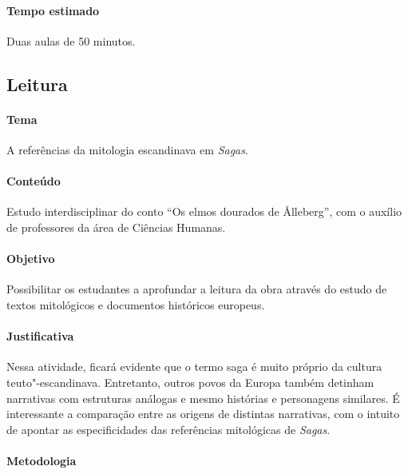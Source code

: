 \documentclass[12pt]{extarticle}
\begin{document}
\paragraph{Tempo estimado} Duas aulas de 50 minutos.


\subsection{Leitura}

\paragraph{Tema} A referências da mitologia escandinava em \emph{Sagas}.

 \paragraph{Conteúdo} Estudo interdisciplinar do conto ``Os elmos dourados de Ålleberg'',
 com o auxílio de professores da área de Ciências Humanas.

\paragraph{Objetivo} Possibilitar os estudantes a aprofundar a leitura da obra através do
estudo de textos mitológicos e documentos históricos europeus.

\paragraph{Justificativa} Nessa atividade, ficará evidente que o termo saga é muito
próprio da cultura teuto"-escandinava. Entretanto, outros povos da Europa
também detinham narrativas com estruturas análogas e mesmo histórias e
personagens similares. É
interessante a comparação entre as origens de distintas narrativas, com 
o intuito de apontar as especificidades das referências mitológicas de \emph{Sagas}.

\paragraph{Metodologia}
\end{document}
